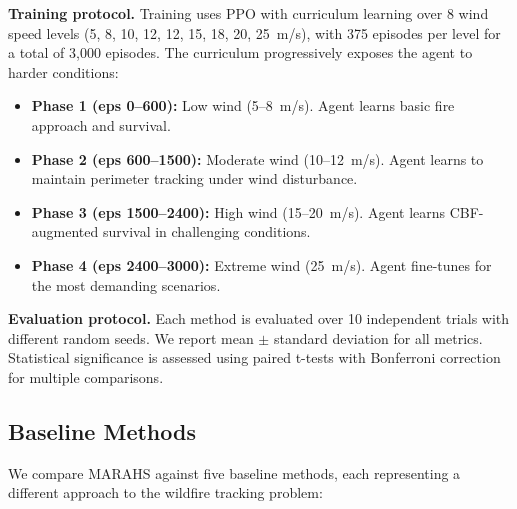 \documentclass[12pt,a4paper]{article}
\begin{document}
\textbf{Training protocol.} Training uses PPO with curriculum learning over 8 wind speed levels (5, 8, 10, 12, 12, 15, 18, 20, 25~m/s), with 375 episodes per level for a total of 3,000 episodes. The curriculum progressively exposes the agent to harder conditions:
\begin{itemize}[leftmargin=*]
    \item \textbf{Phase 1 (eps 0--600):} Low wind (5--8~m/s). Agent learns basic fire approach and survival.
    \item \textbf{Phase 2 (eps 600--1500):} Moderate wind (10--12~m/s). Agent learns to maintain perimeter tracking under wind disturbance.
    \item \textbf{Phase 3 (eps 1500--2400):} High wind (15--20~m/s). Agent learns CBF-augmented survival in challenging conditions.
    \item \textbf{Phase 4 (eps 2400--3000):} Extreme wind (25~m/s). Agent fine-tunes for the most demanding scenarios.
\end{itemize}

\textbf{Evaluation protocol.} Each method is evaluated over 10 independent trials with different random seeds. We report mean $\pm$ standard deviation for all metrics. Statistical significance is assessed using paired t-tests with Bonferroni correction for multiple comparisons.

\subsection{Baseline Methods}

We compare MARAHS against five baseline methods, each representing a different approach to the wildfire tracking problem:
\end{document}
